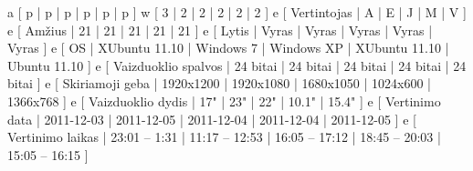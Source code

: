 \xtableu
{
  a [ p | p | p | p | p | p ]
  w [ 3 | 2 | 2 | 2 | 2 | 2 ]
  e [ Vertintojas         | A | E | J | M | V ]
  e [ Amžius              | 21 | 21 | 21 | 21 | 21 ]
  e [ Lytis               | Vyras | Vyras | Vyras | Vyras | Vyras ]
  e [ OS                  | XUbuntu 11.10 | Windows 7 | Windows XP | XUbuntu 11.10 | Ubuntu 11.10 ]
  e [ Vaizduoklio spalvos | 24 bitai | 24 bitai | 24 bitai | 24 bitai | 24 bitai ]
  e [ Skiriamoji geba     | 1920x1200 | 1920x1080 | 1680x1050 | 1024x600 | 1366x768 ]
  e [ Vaizduoklio dydis   | 17" | 23" | 22" | 10.1" | 15.4" ]
  e [ Vertinimo data      | 2011-12-03 | 2011-12-05 | 2011-12-04 | 2011-12-04  | 2011-12-05 ]
  e [ Vertinimo laikas    | 23:01 – 1:31  | 11:17 – 12:53 | 16:05 – 17:12 | 18:45 – 20:03 | 15:05 – 16:15 ]
}
